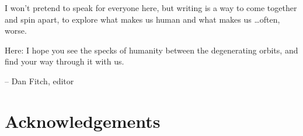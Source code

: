 I won't pretend to speak for everyone here, but writing is a way to come together and spin apart, to explore what makes us human and what makes us \ldots often, worse.

Here: I hope you see the specks of humanity between the degenerating orbits, and find your way through it with us.

\vspace{1em}

\hfill-- Dan Fitch, editor


\clearpage


\specsep{}

\clearpage

\specsep{}

\specsep{}


\specsep{}

\clearpage

\specsep{}

\specsep{}

\specsep{}

\specsep{}

\clearpage

\clearpage

\clearpage

\clearpage

\specsep{}

\specsep{}

\clearpage

\clearpage

\specsep{}

\specsep{}

\specsep{}

\clearpage


\clearpage

\specsep{}


\specsep{}

\clearpage

\chapter*{\variexfont{}Acknowledgements}

